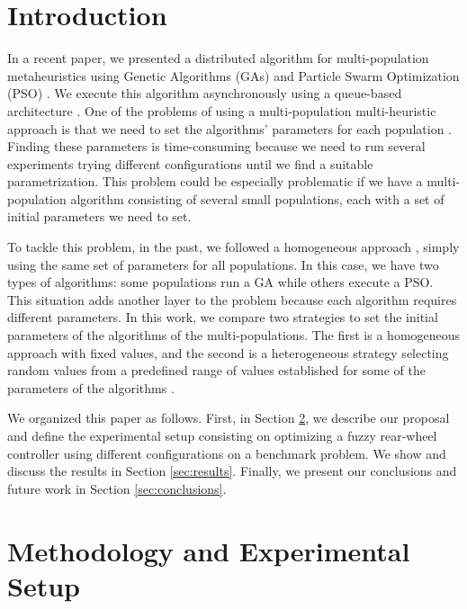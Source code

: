 \documentclass[runningheads]{llncs}
\begin{document}
\section{Introduction}

In a recent paper, we presented a distributed algorithm for multi-population
metaheuristics \cite{mancilla2022optimal,mancilla2022tracking} using Genetic
Algorithms (GAs) \cite{back1996evolutionary,holland1992adaptation} and Particle
Swarm Optimization (PSO) \cite{kennedy2006swarm,clerc2010particle}. We execute
this algorithm asynchronously using a queue-based architecture
\cite{valdez2021container,merelo2018introducing}. One of the problems of using
a multi-population multi-heuristic approach is that we need to set the
algorithms' parameters for each population \cite{ma2019multi}. Finding these
parameters is time-consuming because we need to run several experiments trying
different configurations until we find a suitable parametrization. This problem
could be especially problematic if we have a multi-population algorithm
consisting of several small populations, each with a set of initial parameters
we need to set.

To tackle this problem, in the past, we followed a homogeneous
approach \cite{Mancilla2021}, simply using the same set of parameters for all
populations. In this case, we have two types of algorithms: some populations
run a GA while others execute a PSO. This situation adds another layer to the
problem because each algorithm requires different parameters. In this work, we
compare two strategies to set the initial parameters of the algorithms of the
multi-populations. The first is a homogeneous approach with fixed values, and
the second is a heterogeneous strategy selecting random values from a
predefined range of values established for some of the parameters of the
algorithms \cite{gong2011distributed,hernandez2017randomized}. 

We organized this paper as follows. First, in Section \ref{sec:experiments}, we
describe our proposal and define the experimental setup consisting on
optimizing a fuzzy rear-wheel controller using different configurations on a
benchmark problem. We show and discuss the results in Section
\ref{sec:results}. Finally, we present our conclusions and future work in
Section \ref{sec:conclusions}.

\section{Methodology and Experimental Setup}\label{sec:experiments}
\end{document}
